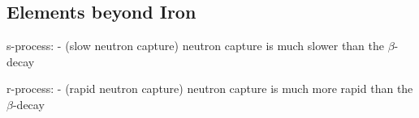 \documentclass[a4paper, 11pt, landscape]{article}
\begin{document}
\begin{multicols*}{3}
\subsection{Elements beyond Iron}
\begin{compactenum}
	\item [\color{red}s-process:] - (slow neutron capture) neutron capture is much slower than the $\beta$-decay
	\item [\color{red}r-process:] - (rapid neutron capture) neutron capture is much more rapid than the$\beta$-decay
\end{compactenum}

\raggedcolumns
\end{multicols*}
\end{document}
